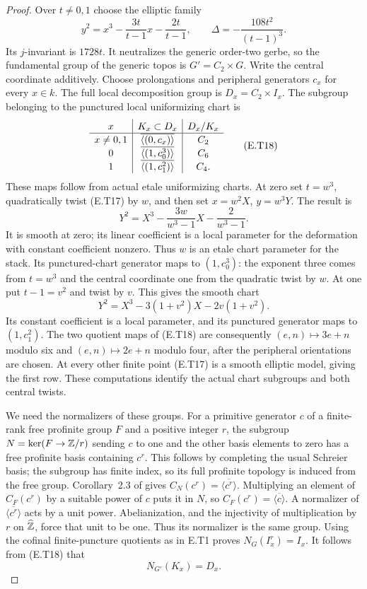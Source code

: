 \begin{proof}
Over $t\ne0,1$ choose the elliptic family
\[
 y^2=x^3-\frac{3t}{t-1}x-\frac{2t}{t-1},
 \qquad \Delta=-\frac{108t^2}{(t-1)^3}.
 \tag{E.T17}
\]
Its $j$-invariant is $1728t$.  It neutralizes the generic
order-two gerbe, so the fundamental group of the generic
topos is $G'=C_2\times G$.  Write the central coordinate
additively.  Choose prolongations and peripheral generators
$c_x$ for every $x\in k$.  The full local decomposition
group is
$D_x=C_2\times I_x$.  The subgroup belonging to the
punctured local uniformizing chart is
\[
 \begin{array}{c|c|c}
 x&K_x\subset D_x&D_x/K_x\rule{0pt}{2.4ex}\\\hline
 x\ne0,1&\overline{\langle(0,c_x)\rangle}&C_2\\
 0&\overline{\langle(1,c_0^3)\rangle}&C_6\\
 1&\overline{\langle(1,c_1^2)\rangle}&C_4.
 \end{array}
 \tag{E.T18}
\]
These maps follow from actual etale uniformizing charts.
At zero set $t=w^3$, quadratically twist (E.T17) by
$w$, and then set $x=w^2X$, $y=w^3Y$.  The result is
\[
 Y^2=X^3-\frac{3w}{w^3-1}X-\frac2{w^3-1}.
\]
It is smooth at zero; its linear coefficient is a
local parameter for the deformation with constant
coefficient nonzero.  Thus $w$ is an etale chart
parameter for the stack.  Its punctured-chart generator
maps to $(1,c_0^3)$: the exponent three comes from
$t=w^3$ and the central coordinate one from the
quadratic twist by $w$.  At one put $t-1=v^2$ and
twist by $v$.  This gives the smooth chart
\[
 Y^2=X^3-3(1+v^2)X-2v(1+v^2).
\]
Its constant coefficient is a local parameter, and its
punctured generator maps to $(1,c_1^2)$.
The two quotient maps of (E.T18) are consequently
$(e,n)\mapsto3e+n$ modulo six and
$(e,n)\mapsto2e+n$ modulo four, after the peripheral
orientations are chosen.  At every other finite point
(E.T17) is a smooth elliptic model, giving the first
row.  These computations identify the actual chart
subgroups and both central twists.

We need the normalizers of these groups.  For a primitive
generator $c$ of a finite-rank free profinite group $F$
and a positive integer $r$, the subgroup
$N=\ker(F\to\mathbb Z/r)$ sending $c$ to one and the other
basis elements to zero has a free profinite basis
containing $c^r$.  This follows by completing the usual
Schreier basis; the subgroup has finite index, so its
full profinite topology is induced from the free group.
Corollary~2.3 of \cite{BuxErshovRapinchuk2011} gives
$C_N(c^r)=\overline{\langle c^r\rangle}$.
Multiplying an element of $C_F(c^r)$ by a suitable
power of $c$ puts it in $N$, so
$C_F(c^r)=\overline{\langle c\rangle}$.
A normalizer of $\overline{\langle c^r\rangle}$ acts
by a unit power.  Abelianization, and the injectivity
of multiplication by $r$ on $\widehat{\mathbb Z}$, force that
unit to be one.  Thus its normalizer is the same group.
Using the cofinal finite-puncture quotients as in E.T1
proves $N_G(I_x^r)=I_x$.  It follows from (E.T18) that
\[
                 N_{G'}(K_x)=D_x.                          \tag{E.T19}
\]


\end{proof}
